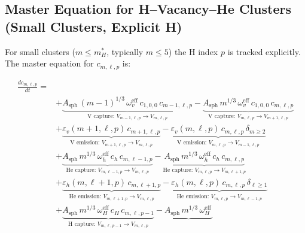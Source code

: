 \subsection{Master Equation for H--Vacancy--He Clusters (Small Clusters,
            Explicit H)}
\label{sec:ME_HVHe}

For small clusters ($m \leq m_H^*$, typically $m \leq 5$) the H index
$p$ is tracked explicitly.  The master equation for $c_{m,\ell,p}$ is:

\begin{equation}\label{eq:ME_HVHe}
\boxed{
\begin{split}
\frac{dc_{m,\ell,p}}{dt} = {} &
    \\
    &+ \underbrace{
       A_{\mathrm{sph}}\,(m{-}1)^{1/3}\,\omega_v^{\mathrm{eff}}\,
       c_{1,0,0}\,c_{m-1,\ell,p}
       }_{\text{V capture: }V_{m-1,\ell,p}\to V_{m,\ell,p}}
     - \underbrace{
       A_{\mathrm{sph}}\,m^{1/3}\,\omega_v^{\mathrm{eff}}\,
       c_{1,0,0}\,c_{m,\ell,p}
       }_{\text{V capture: }V_{m,\ell,p}\to V_{m+1,\ell,p}}
    \\[4pt]
    &+ \underbrace{
       \varepsilon_v(m{+}1,\ell,p)\,c_{m+1,\ell,p}
       }_{\text{V emission: }V_{m+1,\ell,p}\to V_{m,\ell,p}}
     - \underbrace{
       \varepsilon_v(m,\ell,p)\,c_{m,\ell,p}\,\delta_{m\geq 2}
       }_{\text{V emission: }V_{m,\ell,p}\to V_{m-1,\ell,p}}
    \\[4pt]
    &+ \underbrace{
       A_{\mathrm{sph}}\,m^{1/3}\,\omega_h^{\mathrm{eff}}\,
       c_h\,c_{m,\ell-1,p}
       }_{\text{He capture: }V_{m,\ell-1,p}\to V_{m,\ell,p}}
     - \underbrace{
       A_{\mathrm{sph}}\,m^{1/3}\,\omega_h^{\mathrm{eff}}\,
       c_h\,c_{m,\ell,p}
       }_{\text{He capture: }V_{m,\ell,p}\to V_{m,\ell+1,p}}
    \\[4pt]
    &+ \underbrace{
       \varepsilon_h(m,\ell{+}1,p)\,c_{m,\ell+1,p}
       }_{\text{He emission: }V_{m,\ell+1,p}\to V_{m,\ell,p}}
     - \underbrace{
       \varepsilon_h(m,\ell,p)\,c_{m,\ell,p}\,\delta_{\ell\geq 1}
       }_{\text{He emission: }V_{m,\ell,p}\to V_{m,\ell-1,p}}
    \\[4pt]
    &+ \underbrace{
       A_{\mathrm{sph}}\,m^{1/3}\,\omega_H^{\mathrm{eff}}\,
       c_H\,c_{m,\ell,p-1}
       }_{\text{H capture: }V_{m,\ell,p-1}\to V_{m,\ell,p}}
     - \underbrace{
       A_{\mathrm{sph}}\,m^{1/3}\,\omega_H^{\mathrm{eff}}\,
}
\end{split}}
\end{equation}
